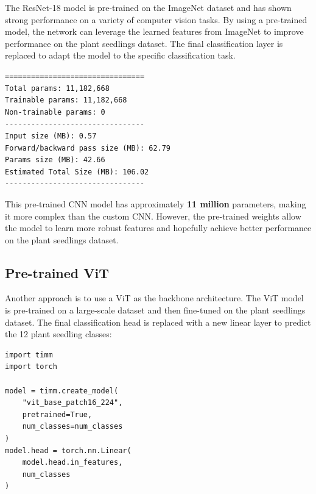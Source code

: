 The ResNet-18 model is pre-trained on the ImageNet dataset \cite{5206848ImageNet} and has shown strong performance on a variety of computer vision tasks. By using a pre-trained model, the network can leverage the learned features from ImageNet to improve performance on the plant seedlings dataset. The final classification layer is replaced to adapt the model to the specific classification task.

\begin{minipage}{0.9\linewidth}\begin{lstlisting}[language={},caption={Pre-trained CNN model summary.},label={lst:pre-trained-cnn-summary}]
================================
Total params: 11,182,668
Trainable params: 11,182,668
Non-trainable params: 0
--------------------------------
Input size (MB): 0.57
Forward/backward pass size (MB): 62.79
Params size (MB): 42.66
Estimated Total Size (MB): 106.02
--------------------------------
\end{lstlisting}\end{minipage}

This pre-trained CNN model has approximately \textbf{11 million} parameters, making it more complex than the custom CNN. However, the pre-trained weights allow the model to learn more robust features and hopefully achieve better performance on the plant seedlings dataset.

\subsection{Pre-trained ViT}

Another approach is to use a ViT \cite{DBLP:journals/corr/abs-2010-11929} as the backbone architecture. The ViT model is pre-trained on a large-scale dataset and then fine-tuned on the plant seedlings dataset. The final classification head is replaced with a new linear layer to predict the 12 plant seedling classes:

\begin{minipage}{0.9\linewidth}\begin{lstlisting}[caption={Replacing the final classification layer of a pre-trained ViT model.},label={lst:pre-trained-vit}]
import timm
import torch

model = timm.create_model(
    "vit_base_patch16_224",
    pretrained=True,
    num_classes=num_classes
)
model.head = torch.nn.Linear(
    model.head.in_features,
    num_classes
)
\end{lstlisting}\end{minipage}

